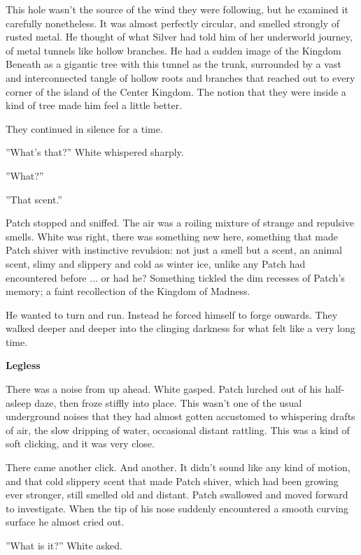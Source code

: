 \documentclass[11pt]{article}
\begin{document}
 This hole wasn't the source of the wind they were following, but he examined it carefully nonetheless. It was almost perfectly circular, and smelled strongly of rusted metal. He thought of what Silver had told him of her underworld journey, of metal tunnels like hollow branches. He had a sudden image of the Kingdom Beneath as a gigantic tree with this tunnel as the trunk, surrounded by a vast and interconnected tangle of hollow roots and branches that reached out to every corner of the island of the Center Kingdom. The notion that they were inside a kind of tree made him feel a little better.\par
 They continued in silence for a time.\par
 ''What's that?'' White whispered sharply.\par
 ''What?''\par
 ''That scent.''\par
 Patch stopped and sniffed. The air was a roiling mixture of strange and repulsive smells. White was right, there was something new here, something that made Patch shiver with instinctive revulsion: not just a smell but a scent, an animal scent, slimy and slippery and cold as winter ice, unlike any Patch had encountered before ... or had he? Something tickled the dim recesses of Patch's memory; a faint recollection of the Kingdom of Madness.\par
 He wanted to turn and run. Instead he forced himself to forge onwards. They walked deeper and deeper into the clinging darkness for what felt like a very long time.\par
\par
{\bf Legless\par
}\par
 There was a noise from up ahead. White gasped. Patch lurched out of his half-asleep daze, then froze stiffly into place. This wasn't one of the usual underground noises that they had almost gotten accustomed to %
 whispering drafts of air, the slow dripping of water, occasional distant rattling. This was a kind of soft clicking, and it was very close. \par
 There came another click. And another. It didn't sound like any kind of motion, and that cold slippery scent that made Patch shiver, which had been growing ever stronger, still smelled old and distant. Patch swallowed and moved forward to investigate. When the tip of his nose suddenly encountered a smooth curving surface he almost cried out.\par
 ''What is it?'' White asked.\par
\end{document}
